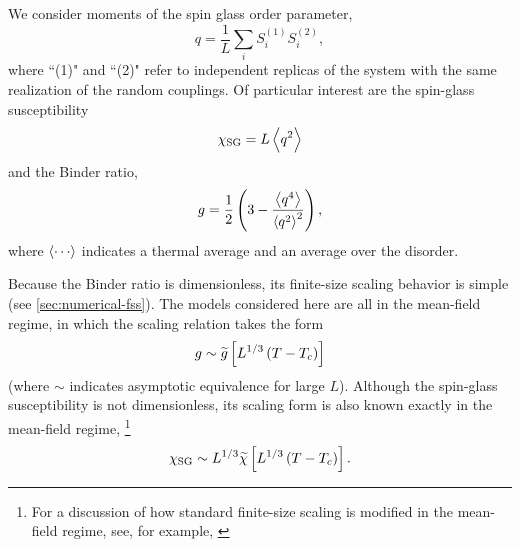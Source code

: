 \begin{table}
  \centering
  \caption[%
    Simulation parameters for one-dimensional long-range models with undiluted
    bonds.
  ]
  {%
    Simulation parameters for the undiluted models. $N_{\mathrm{samp}}$ is the
    number of samples; $N_{\mathrm{equil}}$ and $N_{\mathrm{meas}}$ are the
    numbers of sweeps used for the equilibration and measurement phases
    respectively. We simulate $N_T$ logarithmically-spaced temperatures between
    $T_{\mathrm{min}}$ and $T_{\mathrm{max}}$.
  }
  \label{tab:nonextensive-params-c}
\end{table}

\begin{table}
  \centering
  \caption[%
    Simulation parameters for one-dimensional long-range models with diluted
    bonds.
  ]
  {Simulation parameters for the diluted models.}
  \label{tab:nonextensive-params-d}
\end{table}


We consider moments of the spin glass order parameter,
\begin{equation}
  q = \frac{1}{L} \sum_i S_i^{(1)} S_i^{(2)},
\end{equation}
where ``(1)" and ``(2)" refer to independent replicas of the system with the
same realization of the random couplings. Of particular interest are the
spin-glass susceptibility
\begin{equation}
  \chi_{\mathrm{SG}} = L\left< q^2 \right>
  \label{eq:sgsusc}
\end{equation}
and the Binder ratio,
\begin{equation}
  g = \frac{1}{2}\left(3 - \frac{\left< q^4 \right>}{\left< q^2 \right>^2}\right),
  \label{eq:binder-ratio}
\end{equation}
where $\av{\cdots}$ indicates a thermal average and an average over the disorder.

Because the Binder ratio is dimensionless, its finite-size scaling behavior is
simple (see \cref{sec:numerical-fss}). The models considered here are all in
the mean-field regime, in which the scaling relation takes the form
\begin{equation}
  g \sim \widetilde{g}\left[L^{1/3} \left(T-T_c\right)\right]
  \label{eq:binder-scaling}
\end{equation}
(where $\sim$ indicates asymptotic equivalence for large $L$).
Although the spin-glass susceptibility is not dimensionless, its scaling form
is also known exactly in the mean-field regime,%
\footnote{%
  For a discussion of how standard finite-size scaling is modified in the
  mean-field regime, see, for example,
  \autocite{binder1985finite, luijten1999finite, jones2005finite,
    brezin1982investigation, brezin1985finite}
}
\begin{equation}
  \chi_{\mathrm{SG}} \sim L^{1/3} \widetilde{\chi}\left[L^{1/3} \left(T-T_c\right)\right].
  \label{eq:sgsusc-scaling}
\end{equation}

